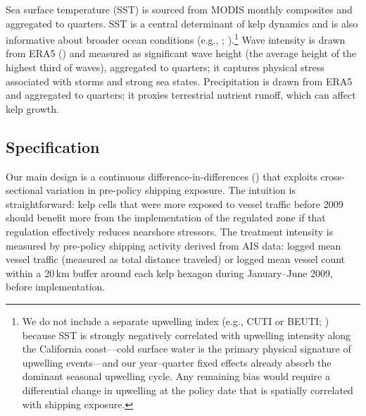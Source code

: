 \documentclass[12pt]{article}
\begin{document}
Sea surface temperature (SST) is sourced from MODIS monthly composites and aggregated to quarters. SST is a central determinant of kelp dynamics and is also informative about broader ocean conditions (e.g., \citealp{Yang2023}; \citealp{Dunstan2018}).\footnote{We do not include a separate upwelling index (e.g., CUTI or BEUTI; \citealp{Jacox2018}) because SST is strongly negatively correlated with upwelling intensity along the California coast---cold surface water is the primary physical signature of upwelling events---and our year--quarter fixed effects already absorb the dominant seasonal upwelling cycle. Any remaining bias would require a differential change in upwelling at the policy date that is spatially correlated with shipping exposure.} Wave intensity is drawn from ERA5 (\citealp{Hersbach2023}) and measured as significant wave height (the average height of the highest third of waves), aggregated to quarters; it captures physical stress associated with storms and strong sea states. Precipitation is drawn from ERA5 and aggregated to quarters; it proxies terrestrial nutrient runoff, which can affect kelp growth.

\subsection{Specification}

Our main design is a continuous difference-in-differences (\citealp{CallawayGoodmanBaconSantAnna2024}) that exploits cross-sectional variation in pre-policy shipping exposure. The intuition is straightforward: kelp cells that were more exposed to vessel traffic before 2009 should benefit more from the implementation of the regulated zone if that regulation effectively reduces nearshore stressors. The treatment intensity is measured by pre-policy shipping activity derived from AIS data: logged mean vessel traffic (measured as total distance traveled) or logged mean vessel count within a 20\,km buffer around each kelp hexagon during January--June 2009, before implementation.
\end{document}

